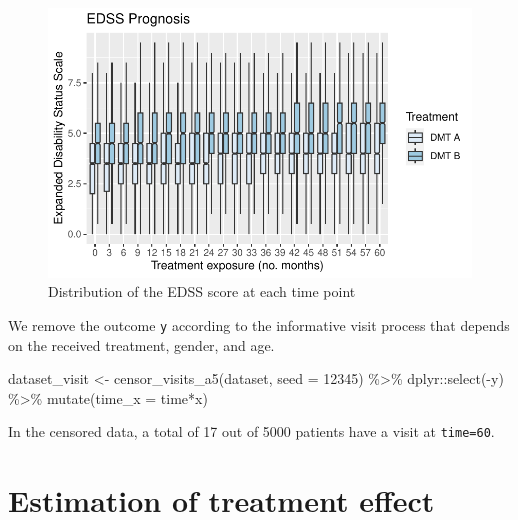 \documentclass[
  letterpaper,
  DIV=11,
  numbers=noendperiod]{scrreprt}
\newenvironment{Shaded}{\begin{snugshade}}{\end{snugshade}}
\newcommand{\AttributeTok}[1]{\textcolor[rgb]{0.40,0.45,0.13}{#1}}
\newcommand{\DecValTok}[1]{\textcolor[rgb]{0.68,0.00,0.00}{#1}}
\newcommand{\FunctionTok}[1]{\textcolor[rgb]{0.28,0.35,0.67}{#1}}
\newcommand{\NormalTok}[1]{\textcolor[rgb]{0.00,0.23,0.31}{#1}}
\newcommand{\OtherTok}[1]{\textcolor[rgb]{0.00,0.23,0.31}{#1}}
\newcommand{\SpecialCharTok}[1]{\textcolor[rgb]{0.37,0.37,0.37}{#1}}
\begin{document}
\begin{figure}

{\centering \includegraphics{chapter_12_files/figure-pdf/unnamed-chunk-4-1.pdf}

}

\caption{Distribution of the EDSS score at each time point}

\end{figure}

We remove the outcome \texttt{y} according to the informative visit
process that depends on the received treatment, gender, and age.

\begin{Shaded}
\begin{Highlighting}[]
\NormalTok{dataset\_visit }\OtherTok{\textless{}{-}} \FunctionTok{censor\_visits\_a5}\NormalTok{(dataset, }\AttributeTok{seed =} \DecValTok{12345}\NormalTok{) }\SpecialCharTok{\%\textgreater{}\%} 
\NormalTok{  dplyr}\SpecialCharTok{::}\FunctionTok{select}\NormalTok{(}\SpecialCharTok{{-}}\NormalTok{y) }\SpecialCharTok{\%\textgreater{}\%}
  \FunctionTok{mutate}\NormalTok{(}\AttributeTok{time\_x =}\NormalTok{ time}\SpecialCharTok{*}\NormalTok{x)}
\end{Highlighting}
\end{Shaded}

In the censored data, a total of 17 out of 5000 patients have a visit at
\texttt{time=60}.

\hypertarget{estimation-of-treatment-effect}{%
\section{Estimation of treatment
effect}\label{estimation-of-treatment-effect}}
\end{document}
